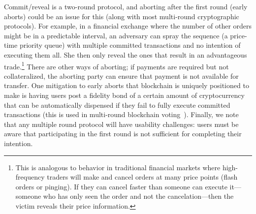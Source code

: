Commit/reveal is a two-round protocol, and aborting after the first round (early aborts) could be an issue for this (along with most multi-round cryptographic protocols). For example, in a financial exchange where the number of other orders might be in a predictable interval, an adversary can spray the sequence (\ie a price-time priority queue) with multiple committed transactions and no intention of executing them all. She then only reveal the ones that result in an advantageous trade.\footnote{This is analogous to behavior in traditional financial markets where high-frequency traders will make and cancel orders at many price points (flash orders or pinging). If they can cancel faster than someone can execute it---someone who has only seen the order and not the cancelation---then the victim reveals their price information.} There are other ways of aborting; if payments are required but not collateralized, the aborting party can ensure that payment is not available for transfer. One mitigation to early aborts that blockchain is uniquely positioned to make is having users post a fidelity bond of a certain amount of cryptocurrency that can be automatically dispensed if they fail to fully execute committed transactions (this is used in multi-round blockchain voting~\cite{mccorry2017smart}). Finally, we note that any multiple round protocol will have usability challenges: users must be aware that participating in the first round is not sufficient for completing their intention.



